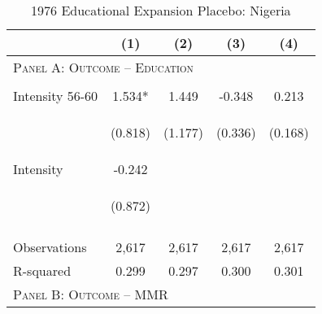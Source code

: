 \begin{subtables}\begin{table}[htpb!]\begin{center}\caption{1976 Educational Expansion Placebo: Nigeria}\label{MMRtab:NigeriaPlacebo}\begin{tabular}{p{5cm}cccc}\toprule&(1)&(2)&(3)&(4)\\ \midrule\multicolumn{5}{l}{\textsc{Panel A: Outcome -- Education}}\\\begin{footnotesize}\end{footnotesize}&\begin{footnotesize}\end{footnotesize}&\begin{footnotesize}\end{footnotesize}&\begin{footnotesize}\end{footnotesize}\\ 
Intensity 56-60&1.534*&1.449&-0.348&0.213\\ 
&\begin{footnotesize}(0.818)\end{footnotesize}&\begin{footnotesize}(1.177)\end{footnotesize}&\begin{footnotesize}(0.336)\end{footnotesize}&\begin{footnotesize}(0.168)\end{footnotesize}\\ 
Intensity      &-0.242&&&\\ 
&\begin{footnotesize}(0.872)\end{footnotesize}&&\\ 
\begin{footnotesize}\end{footnotesize}&\begin{footnotesize}\end{footnotesize}&\begin{footnotesize}\end{footnotesize}&\begin{footnotesize}\end{footnotesize}\\ 
Observations&2,617&2,617&2,617&2,617\\ 
R-squared&0.299&0.297&0.300&0.301\\ \midrule 
\multicolumn{5}{l}{\textsc{Panel B: Outcome -- MMR}}\\ 

\end{tabular}
\end{center}
\end{table}
\end{subtables}

